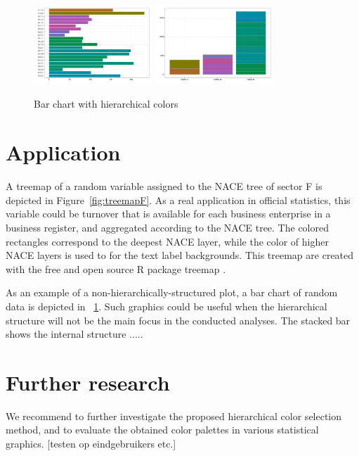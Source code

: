 \documentclass[review]{vgtc}                 %
\begin{document}
\begin{figure}[htb]
  \centering
  \includegraphics[width=1.75in]{bar_chart.pdf}
  \includegraphics[width=1.75in]{stackedbar_chart.pdf}
  \caption{Bar chart with hierarchical colors}\label{fig:barchart}
\end{figure}



\section{Application}

A treemap of a random variable assigned to the NACE tree of sector F is depicted in Figure~\ref{fig:treemapF}. As a real application in official statistics, this variable could be turnover that is available for each business enterprise in a business register, and aggregated according to the NACE tree. The colored rectangles correspond to the deepest NACE layer, while the color of higher NACE layers is used to for the text label backgrounds. This treemap are created with the free and open source R package treemap \cite{treemap}.

As an example of a non-hierarchically-structured plot, a bar chart of random data is depicted in ~\ref{fig:barchart}. Such graphics could be useful when the hierarchical structure will not be the main focus in the conducted analyses. The stacked bar shows the internal structure .....

\section{Further research}

We recommend to further investigate the proposed hierarchical color selection method, and to evaluate the obtained color palettes in various statistical graphics.
[testen op eindgebruikers etc.]




\end{document}

